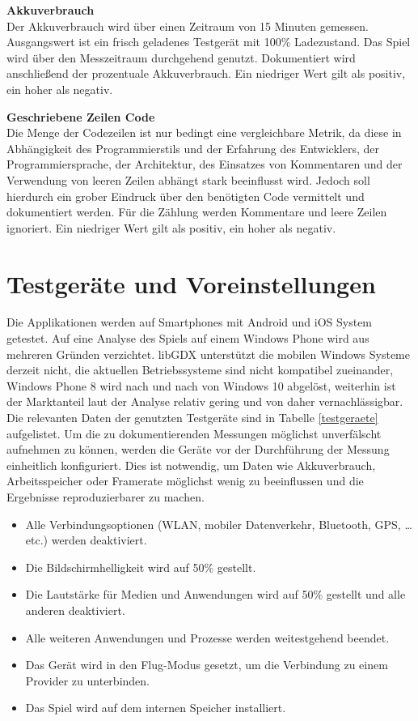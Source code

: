 \bigskip
\textbf{Akkuverbrauch} \\
Der Akkuverbrauch wird über einen Zeitraum von 15 Minuten gemessen. Ausgangswert ist ein frisch geladenes Testgerät mit 100\% Ladezustand. Das Spiel wird über den Messzeitraum durchgehend genutzt. Dokumentiert wird anschließend der prozentuale Akkuverbrauch. Ein niedriger Wert gilt als positiv, ein hoher als negativ.

\bigskip
\textbf{Geschriebene Zeilen Code} \\
Die Menge der Codezeilen ist nur bedingt eine vergleichbare Metrik, da diese in Abhängigkeit des Programmierstils und der Erfahrung des Entwicklers, der Programmiersprache, der Architektur, des Einsatzes von Kommentaren und der Verwendung von leeren Zeilen abhängt stark beeinflusst wird. Jedoch soll hierdurch ein grober Eindruck über den benötigten Code vermittelt und dokumentiert werden. Für die Zählung werden Kommentare und leere Zeilen ignoriert. Ein niedriger Wert gilt als positiv, ein hoher als negativ.


\section{Testgeräte und Voreinstellungen}
Die Applikationen werden auf Smartphones mit Android und iOS System getestet. Auf eine Analyse des Spiels auf einem Windows Phone wird aus mehreren Gründen verzichtet. libGDX unterstützt die mobilen Windows Systeme derzeit nicht, die aktuellen Betriebssysteme sind nicht kompatibel zueinander, Windows Phone 8 wird nach und nach von Windows 10 abgelöst, weiterhin ist der Marktanteil laut der Analyse relativ gering und von daher vernachlässigbar. Die relevanten Daten der genutzten Testgeräte sind in Tabelle \ref{testgeraete} aufgelistet. Um die zu dokumentierenden Messungen möglichst unverfälscht aufnehmen zu können, werden die Geräte vor der Durchführung der Messung einheitlich konfiguriert. Dies ist notwendig, um Daten wie Akkuverbrauch, Arbeitsspeicher oder Framerate möglichst wenig zu beeinflussen und die Ergebnisse reproduzierbarer zu machen.

\begin{itemize}
	\item Alle Verbindungsoptionen (WLAN, mobiler Datenverkehr, Bluetooth, GPS, …etc.) werden deaktiviert.
	\item Die Bildschirmhelligkeit wird auf 50\% gestellt.
	\item Die Lautstärke für Medien und Anwendungen wird auf 50\% gestellt und alle anderen deaktiviert.
	\item Alle weiteren Anwendungen und Prozesse werden weitestgehend beendet.
	\item Das Gerät wird in den Flug-Modus gesetzt, um die Verbindung zu einem Provider zu unterbinden.
	\item Das Spiel wird auf dem internen Speicher installiert.
\end{itemize}

